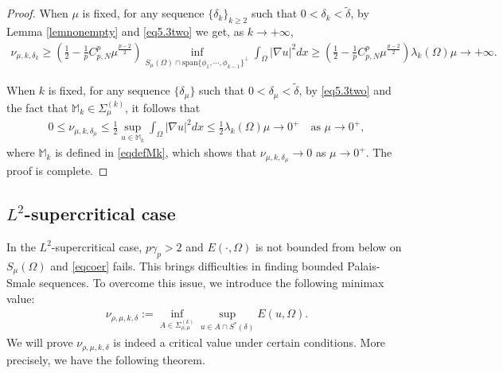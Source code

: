 \documentclass[10pt,a4paper]{article}
\theoremstyle{definition} \theoremstyle{remark}
\numberwithin{equation}{section}
\newcommand{\la}{\lambda}
\newcommand{\ga}{\gamma}
\begin{document}
\begin{proof}
    When $\mu$ is fixed, for any sequence $\{\delta_k\}_{k \ge 2}$ such that $0 < \delta_k < \tilde \delta$, by Lemma \ref{lemnonempty} and \eqref{eq5.3two} we get, as $k \to +\infty$,
    \begin{align}
    	\nu_{\mu,k,\delta_k} \geq \left( \frac12 - \frac1p C_{p,N}^p \mu^{\frac{p-2}{2}}\right)\inf_{S_\mu(\Omega) \cap \text{span}\{\phi_1,\cdots,\phi_{k-1}\}^{\bot}}\int_\Omega |\nabla u|^2dx \ge \left( \frac12 - \frac1p C_{p,N}^p \mu^{\frac{p-2}{2}}\right)\la_k(\Omega) \mu \to +\infty.
    \end{align}

    When $k$ is fixed, for any sequence $\{\delta_\mu\}$ such that $0 < \delta_\mu < \tilde \delta$, by \eqref{eq5.3two} and the fact that $\mathbb{M}_k  \in \Sigma_{\mu}^{(k)}$, it follows that
    \begin{align*}
    	0 \le \nu_{\mu,k,\delta_\mu} \le \frac12 \sup_{u \in \mathbb{M}_k}\int_\Omega |\nabla u|^2dx \le \frac12\la_k(\Omega) \mu \to 0^+ \quad \text{as } \mu \to 0^+,
    \end{align*}
    where $\mathbb{M}_k$ is defined in \eqref{eqdefMk}, which shows that $\nu_{\mu,k,\delta_\mu} \to 0$ as $\mu \to 0^+$. The proof is complete.
\end{proof}

\subsection{$L^2$-supercritical case}

In the $L^2$-supercritical case, $p\ga_p > 2$ and $E(\cdot,\Omega)$ is not bounded from below on $S_\mu(\Omega)$ and \eqref{eqcoer} fails. This brings difficulties in finding bounded Palais-Smale sequences. To overcome this issue, we introduce the following minimax value:
\begin{align}
	\nu_{\rho,\mu,k,\delta} := \inf_{A \in \Sigma_{\rho,\mu}^{(k)}}\sup_{u \in A \cap S^*(\delta)}E(u,\Omega).
\end{align}
We will prove $\nu_{\rho,\mu,k,\delta}$ is indeed a critical value under certain conditions. More precisely, we have the following theorem.
\end{document}
